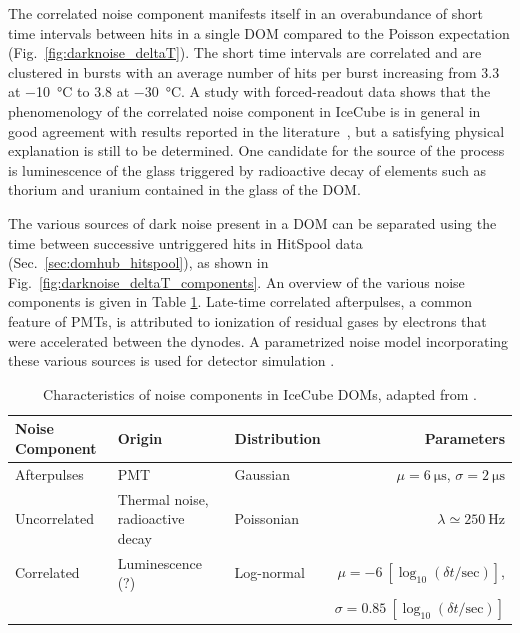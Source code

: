 The correlated noise component manifests itself in an overabundance of
short time intervals between hits in a single DOM compared to the
Poisson expectation (Fig.~\ref{fig:darknoise_deltaT}). The short time
intervals are correlated and are clustered in bursts with an average number of
hits per burst increasing from \num{3.3} at \SI{-10}{\celsius} to \num{3.8} at
\SI{-30}{\celsius}. A study with forced-readout data shows that the
phenomenology of the correlated noise component in IceCube is in general in
good agreement with results reported in the literature~\cite{meyer_noise}, but a satisfying
physical explanation is still to be determined.  One candidate for the source
of the process is luminescence of the glass triggered by radioactive decay of
elements such as thorium and uranium contained in the glass of the DOM.

The various sources of dark noise present in a DOM can be separated using
the time between successive untriggered hits in HitSpool data
(Sec.~\ref{sec:domhub_hitspool}), as shown in 
Fig.~\ref{fig:darknoise_deltaT_components}. An overview of the various 
noise components is given in Table \ref{tab:noise}.  Late-time
correlated afterpulses, a common feature of PMTs, is attributed to
ionization of residual gases by electrons that were accelerated between
the dynodes.  A parametrized noise model incorporating these various sources
is used for detector simulation \cite{larson2013simulation}. 

\begin{table}[h!]
\caption{Characteristics of noise components in IceCube DOMs, adapted from \cite{stanisha_noise_14}.}
  \centering
  \footnotesize
\begin{tabularx}{\textwidth}{lXXr}
\toprule
Noise Component& Origin & Distribution & Parameters \\
\midrule
Afterpulses & PMT & Gaussian & $\mu = \SI{6}{\micro\second}$, $\sigma = \SI{2}{\micro\second}$\\
Uncorrelated & Thermal noise, \newline radioactive decay & Poissonian & $\lambda \simeq \SI{250}{\hertz}$\\
Correlated & Luminescence (?) & Log-normal &
$\mu = \num{-6}\ [\log_{10}(\delta t/\mathrm{sec})]$, \\
& & & 
$\sigma = \num{0.85}\ [\log_{10}(\delta t/\mathrm{sec})]$ \\
\bottomrule
\end{tabularx}
\label{tab:noise}
\end{table}

